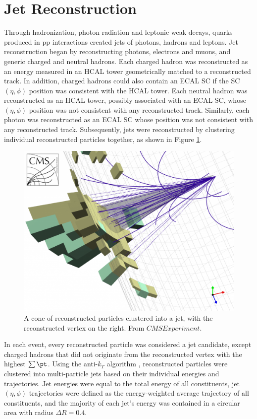 \section{Jet Reconstruction}
\label{sec:jetReco}
Through hadronization, photon radiation and leptonic weak decays, quarks produced in pp interactions 
created jets of photons, hadrons and leptons.  Jet reconstruction began by reconstructing photons, 
electrons and muons, and generic charged and neutral hadrons.  Each charged hadron was reconstructed as 
an energy measured in an HCAL tower geometrically matched to a reconstructed track.  In addition, 
charged hadrons could also contain an ECAL SC if the SC $(\eta, \phi)$ position was consistent with 
the HCAL tower.  Each neutral hadron was reconstructed as an HCAL tower, possibly associated with 
an ECAL SC, whose $(\eta, \phi)$ position was not consistent with any reconstructed track.  Similarly, 
each photon was reconstructed as an ECAL SC whose position was not consistent with any reconstructed 
track.  Subsequently, jets were reconstructed by clustering individual reconstructed particles together, 
as shown in Figure \ref{fig:jetClustering}.

\begin{figure}[h]
	\centering
	\includegraphics[width=1.0\textwidth]{figures/jetClusteringInCMS.png}
	\caption{A cone of reconstructed particles clustered into a jet, with the reconstructed vertex on the right.  
	From $CMS Experiment$.}
	\label{fig:jetClustering}
\end{figure}

In each event, every reconstructed particle was considered a jet candidate, except charged 
hadrons that did not originate from the reconstructed vertex with the highest $\sum \pt$.  Using the 
anti-$k_{T}$ algorithm \cite{antikt}, reconstructed particles were clustered into multi-particle jets 
based on their individual energies and trajectories.  Jet energies were equal to the total energy of 
all constituents, jet $(\eta, \phi)$ trajectories were defined as the energy-weighted average trajectory 
of all constituents, and the majority of each jet's energy was contained in a circular area with radius 
$\Delta R = 0.4$.


